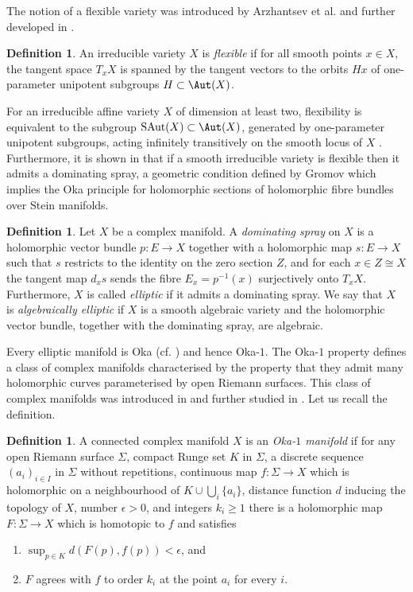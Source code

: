 \documentclass[12pt, a4paper, oneside]{amsart}
\DeclareMathOperator{\SAut}{\text{SAut}}
\theoremstyle{plain} %
\theoremstyle{definition} %
\newtheorem{definition}[theorem]{Definition}
\theoremstyle{remark} %
\begin{document}
The notion of a flexible variety was introduced by Arzhantsev et al. \cite{AZK12} and further developed in \cite{AFK13}.
\begin{definition}
 An irreducible variety $X$ is \emph{flexible} if for all smooth points $x\in X$, the tangent space $T_xX$ is spanned by the tangent vectors to the orbits $Hx$ of one-parameter unipotent subgroups $H\subset \Aut(X)$.
\end{definition}
For an irreducible affine variety $X$ of dimension at least two, flexibility is equivalent to the subgroup $\SAut(X)\subset \Aut(X)$, generated by one-parameter unipotent subgroups, acting infinitely transitively on the smooth locus of $X$ \cite{AFK13}. Furthermore, it is shown in \cite[Proposition A.3]{AFK13} that if a smooth irreducible variety is flexible then it admits a dominating spray, a geometric condition defined by Gromov \cite{Gro89} which implies the Oka principle for holomorphic sections of holomorphic fibre bundles over Stein manifolds.
\begin{definition}
Let $X$ be a complex manifold. A \emph{dominating spray} on $X$ is a holomorphic
vector bundle $p:E\to X$ together with a holomorphic map $s:E\to X$ such
that $s$ restricts to the identity on the zero section $Z$, and for each $x\in Z\cong X$ the tangent map $d_xs$ sends the fibre $E_x=p^{-1}(x)$ surjectively onto $T_xX$. Furthermore, $X$ is called \emph{elliptic} if it admits a dominating spray. We say that $X$ is \emph{algebraically elliptic} if $X$ is a smooth algebraic variety and the holomorphic vector bundle, together with the dominating spray, are algebraic.
\end{definition}
Every elliptic manifold is Oka (cf. \cite[Corollary 5.6.14]{For17}) and hence Oka-$1$. The Oka-$1$ property defines a class of complex manifolds characterised by the property that they admit many holomorphic curves parameterised by open Riemann surfaces. This class of complex manifolds was introduced in \cite{AF25} and further studied in \cite{FL25}. Let us recall the definition.

\begin{definition}
A connected complex manifold $X$ is an \emph{Oka-$1$ manifold} if for any open Riemann surface $\Sigma$, compact Runge set $K$ in $\Sigma$, a discrete sequence $(a_i)_{i\in I}$ in $\Sigma$ without repetitions, continuous map $f:\Sigma\to X$ which is holomorphic on a neighbourhood of $K\cup \bigcup_i \{a_i\}$, distance function $d$ inducing the topology of $X$, number $\epsilon >0$, and integers $k_i\geq 1$ there is a holomorphic map $F:\Sigma \to X$ which is homotopic to $f$ and satisfies
\begin{enumerate}
\item[(1)] $\sup_{p\in K}d(F(p),f(p))< \epsilon$, and
\item[(2)] $F$ agrees with $f$ to order $k_i$ at the point $a_i$ for every $i$.
\end{enumerate} 
\end{definition}
\end{document}
